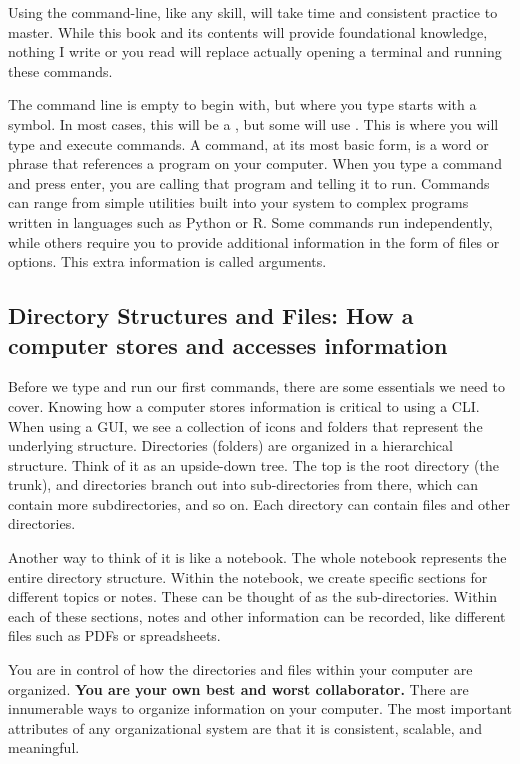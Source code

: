 Using the command-line, like any skill, will take time and consistent practice to master. While this book and its contents will provide foundational knowledge, nothing I write or you read will replace actually opening a terminal and running these commands.

The command line is empty to begin with, but where you type starts with a symbol. In most cases, this will be a \code{\$}, but some will use \code{\%}. This is where you will type and execute commands. A command, at its most basic form, is a word or phrase that references a program on your computer. When you type a command and press enter, you are calling that program and telling it to run. Commands can range from simple utilities built into your system to complex programs written in languages such as Python or R. Some commands run independently, while others require you to provide additional information in the form of files or options. This extra information is called arguments.

\subsection{Directory Structures and Files: How a computer stores and accesses information}

Before we type and run our first commands, there are some essentials we need to cover. Knowing how a computer stores information is critical to using a CLI. When using a GUI, we see a collection of icons and folders that represent the underlying structure. Directories (folders) are organized in a hierarchical structure. Think of it as an upside-down tree. The top is the root directory (the trunk), and directories branch out into sub-directories from there, which can contain more subdirectories, and so on. Each directory can contain files and other directories.

Another way to think of it is like a notebook. The whole notebook represents the entire directory structure. Within the notebook, we create specific sections for different topics or notes. These can be thought of as the sub-directories. Within each of these sections, notes and other information can be recorded, like different files such as PDFs or spreadsheets.

You are in control of how the directories and files within your computer are organized. \textbf{You are your own best and worst collaborator.} There are innumerable ways to organize information on your computer. The most important attributes of any organizational system are that it is consistent, scalable, and meaningful.

